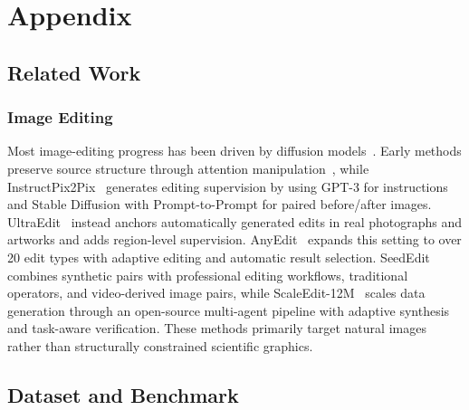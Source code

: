 \section{Appendix}
\label{sec:Appendix}

\subsection{Related Work}
\label{subsec:Related Work}

\subsubsection{Image Editing}
\label{subsubsec:Image Editing}
Most image-editing progress has been driven by diffusion models~\citep{neurips2020-ddpm}. Early methods preserve source structure through attention manipulation~\citep{mokady2022null}, while InstructPix2Pix~\citep{Brooks2022InstructPix2PixLT} generates editing supervision by using GPT-3 for instructions and Stable Diffusion with Prompt-to-Prompt for paired before/after images. UltraEdit~\citep{zhao2024ultraeditinstructionbasedfinegrainedimage} instead anchors automatically generated edits in real photographs and artworks and adds region-level supervision. AnyEdit~\citep{Yu2024AnyEditMU} expands this setting to over 20 edit types with adaptive editing and automatic result selection. SeedEdit~\citep{wang2025seededit30fasthighquality} combines synthetic pairs with professional editing workflows, traditional operators, and video-derived image pairs, while ScaleEdit-12M~\citep{chen2026scaleedit12mscalingopensourceimage} scales data generation through an open-source multi-agent pipeline with adaptive synthesis and task-aware verification. These methods primarily target natural images rather than structurally constrained scientific graphics.

\subsection{Dataset and Benchmark}
\label{subsec:Dataset and Benchmark}

